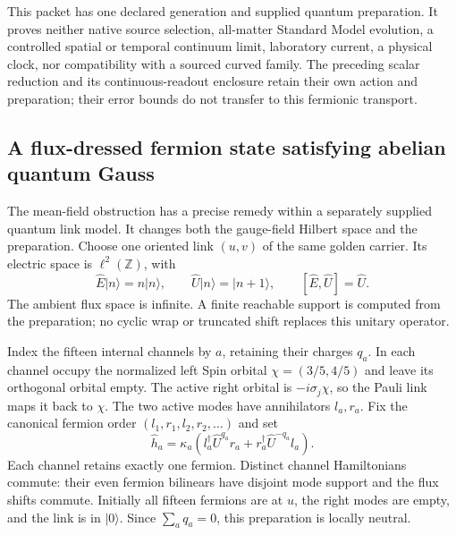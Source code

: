 This packet has one declared generation and supplied quantum preparation.
It proves neither native source selection, all-matter Standard Model
evolution, a controlled spatial or temporal continuum limit, laboratory
current, a physical clock, nor compatibility with a sourced curved family.
The preceding scalar reduction and its continuous-readout enclosure retain
their own action and preparation; their error bounds do not transfer to
this fermionic transport.

\subsection{A flux-dressed fermion state satisfying abelian quantum Gauss}
\label{sec:fermion-quantum-link}

The mean-field obstruction has a precise remedy within a separately
supplied quantum link model. It changes both the gauge-field Hilbert space
and the preparation. Choose one oriented link $(u,v)$ of the same golden
carrier. Its electric space is $\ell^2(\mathbb Z)$, with
\[
 \widehat E|n\rangle=n|n\rangle,\qquad
 \widehat U|n\rangle=|n+1\rangle,\qquad
 [\widehat E,\widehat U]=\widehat U.
\]
The ambient flux space is infinite. A finite reachable support is computed
from the preparation; no cyclic wrap or truncated shift replaces this
unitary operator.

Index the fifteen internal channels by $a$, retaining their charges $q_a$.
In each channel occupy the normalized left Spin orbital
$\chi=(3/5,4/5)$ and leave its orthogonal orbital empty. The active right
orbital is $-i\sigma_j\chi$, so the Pauli link maps it back to $\chi$.
The two active modes have annihilators $l_a,r_a$. Fix the canonical
fermion order $(l_1,r_1,l_2,r_2,\ldots)$ and set
\begin{equation}
 \widehat h_a=\kappa_a
 \left(l_a^\dagger\widehat U^{q_a}r_a
       +r_a^\dagger\widehat U^{-q_a}l_a\right).
 \label{eq:quantum-link-fermion-action}
\end{equation}
Each channel retains exactly one fermion. Distinct channel Hamiltonians
commute: their even fermion bilinears have disjoint mode support and the
flux shifts commute. Initially all fifteen fermions are at $u$, the right
modes are empty, and the link is in $|0\rangle$. Since
$\sum_a q_a=0$, this preparation is locally neutral.

